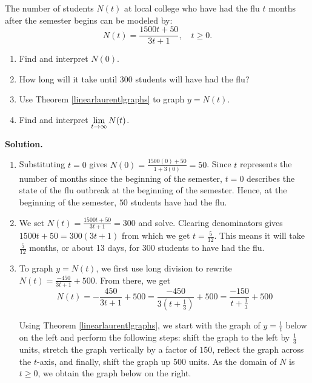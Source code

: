 \documentclass{ximera}
\begin{document}
\begin{ex}  \label{fluex} The number of students $N(t)$ at local college who have had the flu $t$ months after the semester begins can be modeled by: \[ N(t) = \dfrac{1500t + 50}{3t+1},  \quad t \geq 0.\]

\begin{enumerate}

\item  Find and interpret $N(0)$.

\item  How long will it take until $300$ students will have had the flu?

\item  Use Theorem \ref{linearlaurentlgraphs} to graph $y = N(t)$.  

\item  Find and interpret $\ds{\lim_{t \rightarrow \infty} N(t)}$.

\end{enumerate}

{ \bf Solution.}

\begin{enumerate}

\item  Substituting $t=0$ gives $N(0) = \frac{1500(0) + 50}{1+3(0)} = 50$.  Since $t$ represents the number of months since the beginning of the semester, $t=0$ describes the state of the flu outbreak at the beginning of the semester. Hence,  at the beginning of the semester, $50$ students have had the flu.

\item  We set $N(t) = \frac{1500t + 50}{3t+1}  = 300$ and solve.  Clearing denominators gives $1500t + 50 = 300(3t+1)$ from which we get $t = \frac{5}{12}$.  This means it will take $\frac{5}{12}$ months, or about 13 days, for $300$ students to have had the flu.

\item To graph $y = N(t)$, we first use long division to rewrite $N(t) = \frac{-450}{3t+1} + 500$.  From there, we get  \[N(t) =  -\frac{450}{3t+1} + 500  = \frac{-450}{3\left(t + \frac{1}{3}\right)} + 500 = \frac{-150}{t+\frac{1}{3}} + 500\]

Using Theorem \ref{linearlaurentlgraphs}, we start with the graph of $y = \frac{1}{t}$ below on the left and perform the following steps: shift the graph to the left by $\frac{1}{3}$ units, stretch the graph vertically by a factor of $150$, reflect the graph across the $t$-axis, and finally, shift the graph up $500$ units.   As the domain of $N$ is $t \geq 0$, we obtain the graph below on the right.


\end{enumerate}
\end{ex}
\end{document}
